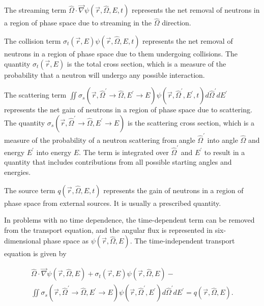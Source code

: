 The streaming term $\hat{\Omega}\cdot\vec{\nabla}\psi\left(\vec{r},\hat{\Omega},E,t\right)$
represents the net removal of neutrons in a region of phase space due to streaming in the $\hat{\Omega}$ direction.

The collision term $\sigma_t\left(\vec{r},E\right)\psi\left(\vec{r},\hat{\Omega},E,t\right)$
represents the net removal of neutrons in a region of phase space due to them undergoing collisions.
The quantity $\sigma_t\left(\vec{r},E\right)$ is the total cross section, which is a measure of the probability that a neutron will undergo any possible interaction.

The scattering term $\iint\sigma_s\left(\vec{r},\hat{\Omega}^\prime\rightarrow\hat{\Omega},E^\prime\rightarrow E\right)\psi\left(\vec{r},\hat{\Omega}^\prime,E^\prime,t\right)d\hat{\Omega}^\prime dE^\prime$
represents the net gain of neutrons in a region of phase space due to scattering.
The quantity $\sigma_s\left(\vec{r},\hat{\Omega}^\prime\rightarrow\hat{\Omega},E^\prime\rightarrow E\right)$ is the scattering cross section,
which is a measure of the probability of a neutron scattering from angle $\hat{\Omega}^\prime$ into angle ${\hat{\Omega}}$ and energy $E^\prime$ into energy $E$.
The term is integrated over $\hat{\Omega}^\prime$ and $E^\prime$ to result in a quantity that includes contributions from all possible starting angles and energies.

The source term $q\left(\vec{r},\hat{\Omega},E,t\right)$
represents the gain of neutrons in a region of phase space from external sources.
It is usually a prescribed quantity.

In problems with no time dependence, the time-dependent term can be removed from the transport equation,
and the angular flux is represented in six-dimensional phase space as $\psi\left(\vec{r},\hat{\Omega},E\right)$.
The time-independent transport equation is given by

\begin{multline}\label{eq:bg:rt:transport}
  \hat{\Omega}\cdot\vec{\nabla}\psi\left(\vec{r},\hat{\Omega},E\right) +
  \sigma_t\left(\vec{r},E\right)\psi\left(\vec{r},\hat{\Omega},E\right) - \\
  \iint\sigma_s\left(\vec{r},\hat{\Omega}^\prime\rightarrow\hat{\Omega},E^\prime\rightarrow E\right)\psi\left(\vec{r},\hat{\Omega}^\prime,E^\prime\right)d\hat{\Omega}^\prime dE^\prime =
  q\left(\vec{r},\hat{\Omega},E\right).
\end{multline}


